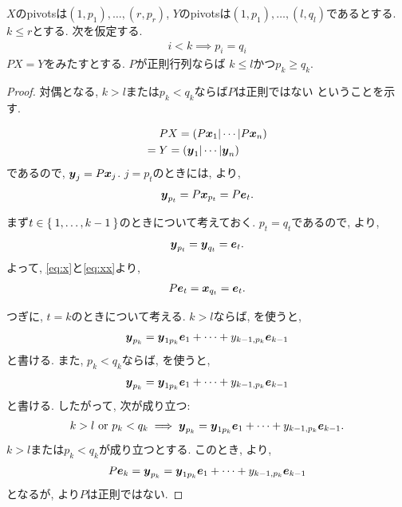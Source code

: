 \begin{lemma}
  \label{lem:8}
  $X$のpivotsは$(1,p_1),\ldots,(r,p_r)$,
  $Y$のpivotsは$(1,p_1),\ldots,(l,q_l)$であるとする.
  $k\leq r$とする.
  次を仮定する.
  \begin{align*}
    i<k \implies p_i=q_i
  \end{align*}
  $PX=Y$をみたすとする.
  $P$が正則行列ならば
  $k\leq l$かつ$p_k\geq q_k$. 
\end{lemma}
\begin{proof}
  対偶となる,
  $k> l$または$p_k< q_k$ならば$P$は正則ではない
  ということを示す.
  
  \begin{align*}
    &PX=(P\boldsymbol{x}_1|\cdots|P\boldsymbol{x}_n)\\
    ={}&Y=(\boldsymbol{y}_1|\cdots|\boldsymbol{y}_n)
  \end{align*}
  であるので, $\boldsymbol{y}_j=P\boldsymbol{x}_j$.
  $j=p_t$のときには, より,
  \begin{align}
    \boldsymbol{y}_{p_t}=P\boldsymbol{x}_{p_t}=P\boldsymbol{e}_t.
    \label{eq:x}
  \end{align}

  まず$t\in\Set{1,\ldots,k-1}$のときについて考えておく.
  $p_t=q_t$であるので,
  より,
  \begin{align}
    \boldsymbol{y}_{p_t}=\boldsymbol{y}_{q_t}=\boldsymbol{e}_t.
    \label{eq:xx}
  \end{align}
  よって, \eqref{eq:x}と\eqref{eq:xx}より,
  \begin{align*}
    P\boldsymbol{e}_t=\boldsymbol{x}_{q_t}=\boldsymbol{e}_t.
  \end{align*}


  つぎに, $t=k$のときについて考える.
  $k>l$ならば, を使うと,
  \begin{align*}
    \boldsymbol{y}_{p_k}=\boldsymbol{y}_{1p_k}\boldsymbol{e}_1+\cdots+y_{k-1,p_k}\boldsymbol{e}_{k-1}
  \end{align*}
  と書ける.
  また, $p_k<q_k$ならば, を使うと,
  \begin{align*}
    \boldsymbol{y}_{p_k}=\boldsymbol{y}_{1p_k}\boldsymbol{e}_1+\cdots+y_{k-1,p_k}\boldsymbol{e}_{k-1}
  \end{align*}
  と書ける.
  したがって,
  次が成り立つ:
  \begin{align*}
    k>l \text{ or } p_k<q_k
    \implies
    \boldsymbol{y}_{p_k}=\boldsymbol{y}_{1p_k}\boldsymbol{e}_1+\cdots+y_{k-1,p_k}\boldsymbol{e}_{k-1}.
  \end{align*}
  $k>l$または$p_k<q_k$が成り立つとする.
  このとき, より,
  \begin{align*}
    P\boldsymbol{e}_k
    =\boldsymbol{y}_{p_k}
    =\boldsymbol{y}_{1p_k}\boldsymbol{e}_1+\cdots+y_{k-1,p_k}\boldsymbol{e}_{k-1}
  \end{align*}
  となるが,
  より$P$は正則ではない.
\end{proof}

